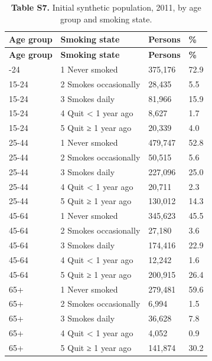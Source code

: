 \footnotesize
\begin{longtable}{llll}
\caption{\textbf{Table S7.} Initial synthetic population, 2011, by age group and smoking state.}\\
\toprule
\textbf{Age group} & \textbf{Smoking state} & \textbf{Persons} & \textbf{\%} \\
\midrule
\endfirsthead
\toprule
\textbf{Age group} & \textbf{Smoking state} & \textbf{Persons} & \textbf{\%} \\
\midrule
\endhead
\bottomrule
\endfoot
15-24 & 1 Never smoked & 375,176 & 72.9 \\
15-24 & 2 Smokes occasionally & 28,435 & 5.5 \\
15-24 & 3 Smokes daily & 81,966 & 15.9 \\
15-24 & 4 Quit < 1 year ago & 8,627 & 1.7 \\
15-24 & 5 Quit ≥ 1 year ago & 20,339 & 4.0 \\
25-44 & 1 Never smoked & 479,747 & 52.8 \\
25-44 & 2 Smokes occasionally & 50,515 & 5.6 \\
25-44 & 3 Smokes daily & 227,096 & 25.0 \\
25-44 & 4 Quit < 1 year ago & 20,711 & 2.3 \\
25-44 & 5 Quit ≥ 1 year ago & 130,012 & 14.3 \\
45-64 & 1 Never smoked & 345,623 & 45.5 \\
45-64 & 2 Smokes occasionally & 27,180 & 3.6 \\
45-64 & 3 Smokes daily & 174,416 & 22.9 \\
45-64 & 4 Quit < 1 year ago & 12,242 & 1.6 \\
45-64 & 5 Quit ≥ 1 year ago & 200,915 & 26.4 \\
65+ & 1 Never smoked & 279,481 & 59.6 \\
65+ & 2 Smokes occasionally & 6,994 & 1.5 \\
65+ & 3 Smokes daily & 36,628 & 7.8 \\
65+ & 4 Quit < 1 year ago & 4,052 & 0.9 \\
65+ & 5 Quit ≥ 1 year ago & 141,874 & 30.2 \\
\end{longtable}
\normalsize
